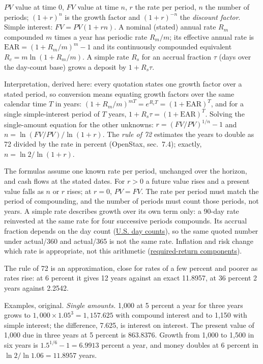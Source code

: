 \begin{qfdefinition}
 $PV$ value at time 0, $FV$ value at time $n$, $r$ the rate per period, $n$ the number of periods; $(1+r)^n$ is the growth factor and $(1+r)^{-n}$ the \emph{discount factor}. Simple interest: $FV=PV(1+rn)$. A nominal (stated) annual rate $R_m$ compounded $m$ times a year has periodic rate $R_m/m$; its effective annual rate is $\mathrm{EAR}=(1+R_m/m)^m-1$ and its continuously compounded equivalent $R_c=m\ln(1+R_m/m)$. A simple rate $R_s$ for an accrual fraction $\tau$ (days over the day-count base) grows a deposit by $1+R_s\tau$.

Interpretation, derived here: every quotation states one growth factor over a stated period, so conversion means equating growth factors over the same calendar time $T$ in years: $(1+R_m/m)^{mT}=e^{R_cT}=(1+\mathrm{EAR})^T$, and for a single simple-interest period of $T$ years, $1+R_s\tau=(1+\mathrm{EAR})^T$. Solving the single-amount equation for the other unknowns: $r=(FV/PV)^{1/n}-1$ and $n=\ln(FV/PV)/\ln(1+r)$. The \emph{rule of 72} estimates the years to double as 72 divided by the rate in percent (OpenStax, sec.~7.4); exactly, $n=\ln2/\ln(1+r)$.

 The formulas assume one known rate per period, unchanged over the horizon, and cash flows at the stated dates. For $r>0$ a future value rises and a present value falls as $n$ or $r$ rises; at $r=0$, $PV=FV$. The rate per period must match the period of compounding, and the number of periods must count those periods, not years. A simple rate describes growth over its own term only: a 90-day rate reinvested at the same rate for four successive periods compounds. Its accrual fraction depends on the day count (\hyperref[conv:us-rate-quotation]{U.S. day counts}), so the same quoted number under actual/360 and actual/365 is not the same rate. Inflation and risk change which rate is appropriate, not this arithmetic (\hyperref[def:required-return-components]{required-return components}).

The rule of 72 is an approximation, close for rates of a few percent and poorer as rates rise: at 6 percent it gives 12 years against an exact 11.8957, at 36 percent 2 years against 2.2542.

 Examples, original. \emph{Single amounts.} 1{,}000 at 5 percent a year for three years grows to $1{,}000\times1.05^3=1{,}157.625$ with compound interest and to 1{,}150 with simple interest; the difference, 7.625, is interest on interest. The present value of 1{,}000 due in three years at 5 percent is 863.8376. Growth from 1{,}000 to 1{,}500 in six years is $1.5^{1/6}-1=6.9913$ percent a year, and money doubles at 6 percent in $\ln2/\ln1.06=11.8957$ years.


\end{qfdefinition}
